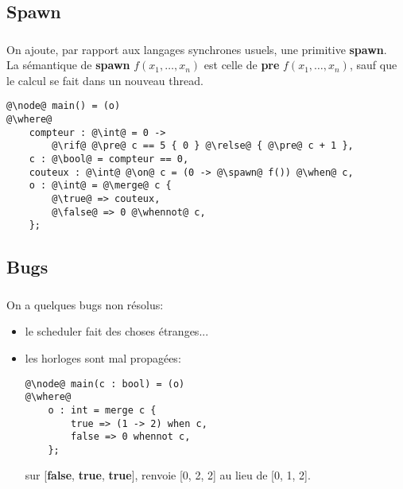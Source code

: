 \documentclass[professionalfonts]{beamer}
\makeatletter
\newcommand*{\currentname}{\@currentlabelname}
\newcommand{\keyword}[1]{{\color{green!50!black}\bf{#1}}}
\newcommand{\pre}{\keyword{pre}}
\newcommand{\true}{\keyword{true}}
\newcommand{\spawn}{\keyword{spawn}}
\newcommand{\false}{\keyword{false}}
\makeatother
\begin{document}
\subsection{Spawn}
\begin{frame}[fragile]
  \frametitle{\currentname}

  On ajoute, par rapport aux langages synchrones usuels, une primitive \spawn{}.\pause\\
  La sémantique de \spawn{} \(f(x_1,\ldots,x_n)\) est celle de \pre{} \(f(x_1,\ldots,x_n)\),
  sauf que le calcul se fait dans un nouveau thread.\pause
  \begin{verbatim}
@\node@ main() = (o)
@\where@
    compteur : @\int@ = 0 ->
        @\rif@ @\pre@ c == 5 { 0 } @\relse@ { @\pre@ c + 1 },
    c : @\bool@ = compteur == 0,
    couteux : @\int@ @\on@ c = (0 -> @\spawn@ f()) @\when@ c,
    o : @\int@ = @\merge@ c {
        @\true@ => couteux,
        @\false@ => 0 @\whennot@ c,
    };
  \end{verbatim}
\end{frame}

\subsection{Bugs}
\begin{frame}[fragile]
  \frametitle{\currentname}

  On a quelques bugs non résolus:\pause
  \begin{itemize}
  \item le scheduler fait des choses étranges...
    \pause
  \item les horloges sont mal propagées:\pause{}
    \begin{verbatim}
@\node@ main(c : bool) = (o)
@\where@
    o : int = merge c {
        true => (1 -> 2) when c,
        false => 0 whennot c,
    };
    \end{verbatim}
    sur [\false, \true, \true], renvoie [0, 2, 2] au lieu de [0, 1, 2].
  \end{itemize}
\end{frame}
\end{document}
